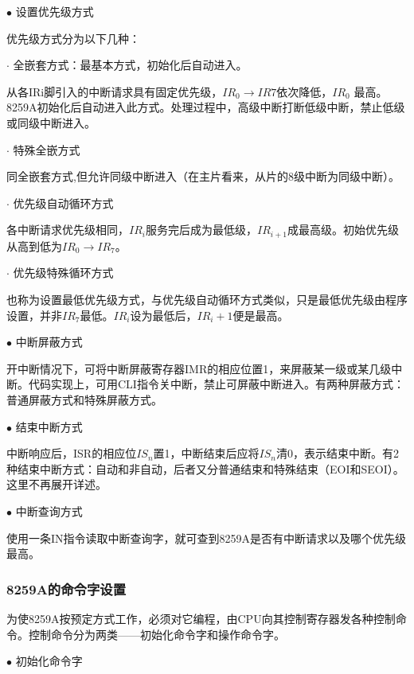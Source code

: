\documentclass[UTF8,12pt]{ctexart}
\begin{document}
    $\bullet$ 设置优先级方式
    
    优先级方式分为以下几种：
    
    $\cdot$ 全嵌套方式：最基本方式，初始化后自动进入。
    
    从各IRi脚引入的中断请求具有固定优先级，$IR_0 \rightarrow IR7$依次降低，$IR_0$ 最高。8259A初始化后自动进入此方式。处理过程中，高级中断打断低级中断，禁止低级或同级中断进入。
    
    $\cdot$ 特殊全嵌方式
    
    同全嵌套方式,但允许同级中断进入（在主片看来，从片的8级中断为同级中断）。
    
    $\cdot$ 优先级自动循环方式
    
    各中断请求优先级相同，$IR_i$服务完后成为最低级，$IR_{i+1}$成最高级。初始优先级从高到低为$IR_0 \rightarrow IR_7$。
    
    $\cdot$ 优先级特殊循环方式
    
    也称为设置最低优先级方式，与优先级自动循环方式类似，只是最低优先级由程序设置，并非$IR_7$最低。$IR_i$设为最低后，$IR_i+1$便是最高。
    
    $\bullet$ 中断屏蔽方式
    
    开中断情况下，可将中断屏蔽寄存器IMR的相应位置1，来屏蔽某一级或某几级中断。代码实现上，可用CLI指令关中断，禁止可屏蔽中断进入。有两种屏蔽方式：普通屏蔽方式和特殊屏蔽方式。
    
    $\bullet$ 结束中断方式
    
    中断响应后，ISR的相应位$IS_n$置1，中断结束后应将$IS_n$清0，表示结束中断。有2种结束中断方式：自动和非自动，后者又分普通结束和特殊结束（EOI和SEOI）。这里不再展开详述。
    
    $\bullet$ 中断查询方式
    
    使用一条IN指令读取中断查询字，就可查到8259A是否有中断请求以及哪个优先级最高。
    
    \subsubsection{8259A的命令字设置\label{命令字设置}}
    为使8259A按预定方式工作，必须对它编程，由CPU向其控制寄存器发各种控制命令。控制命令分为两类——初始化命令字和操作命令字。
    
    $\bullet$ 初始化命令字
    
\end{document}
